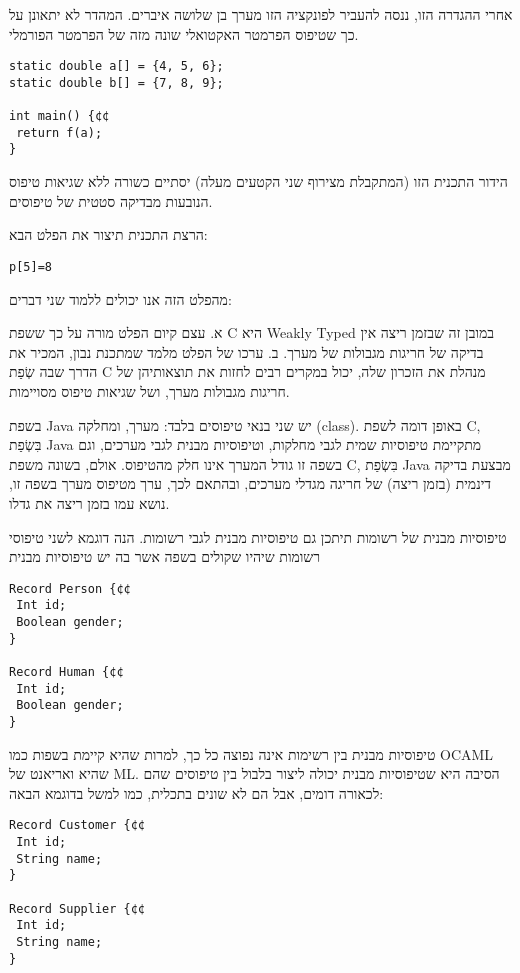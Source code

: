       אחרי ההגדרה הזו, ננסה להעביר לפונקציה הזו מערך בן שלושה איברים. המהדר לא יתאונן על כך שטיפוס הפרמטר האקטואלי שונה מזה של הפרמטר הפורמלי.

\begin{verbatim}
static double a[] = {4, 5, 6};
static double b[] = {7, 8, 9};

int main() {¢¢
 return f(a);
}
\end{verbatim}

      הידור התכנית הזו (המתקבלת מצירוף שני הקטעים מעלה) יסתיים כשורה ללא שגיאות טיפוס הנובעות מבדיקה סטטית של טיפוסים.

      הרצת התכנית תיצור את הפלט הבא:

\begin{verbatim}
p[5]=8
\end{verbatim}

      מהפלט הזה אנו יכולים ללמוד שני דברים:

      א. עצם קיום הפלט מורה על כך ששפת C היא Weakly Typed במובן זה שבזמן ריצה אין בדיקה של חריגות מגבולות של מערך.
      ב. ערכו של הפלט מלמד שמתכנת נבון, המכיר את הדרך שבה שְׂפַת C מנהלת את הזכרון שלה, יכול במקרים רבים לחזות את תוצאותיהן של חריגות מגבולות מערך, ושל שגיאות טיפוס מסויימות.

      בשפת Java יש שני בנאי טיפוסים בלבד: מערך, ומחלקה (class). באופן דומה לשפת C, בִּשְׂפַת Java מתקיימת טיפוסיות שמית לגבי מחלקות, וטיפוסיות מבנית לגבי מערכים, וגם בשפה זו גודל המערך אינו חלק מהטיפוס. אולם, בשונה משפת C, בִּשְׂפַת Java מבצעת בדיקה דינמית (בזמן ריצה) של חריגה מגדלי מערכים, ובהתאם לכך, ערך מטיפוס מערך בשפה זו, נושא עמו בזמן ריצה את גדלו.

      טיפוסיות מבנית של רשומות
      תיתכן גם טיפוסיות מבנית לגבי רשומות. הנה דוגמא לשני טיפוסי רשומות שיהיו שקולים בשפה אשר בה יש טיפוסיות מבנית

\begin{verbatim}
Record Person {¢¢
 Int id;
 Boolean gender;
}

Record Human {¢¢
 Int id;
 Boolean gender;
}
\end{verbatim}

      טיפוסיות מבנית בין רשימות אינה נפוצה כל כך, למרות שהיא קיימת בשפות כמו OCAML שהיא ואריאנט של ML. הסיבה היא שטיפוסיות מבנית יכולה ליצור בלבול בין טיפוסים שהם לכאורה דומים, אבל הם לא שונים בתכלית, כמו למשל בדוגמא הבאה:

\begin{verbatim}
Record Customer {¢¢
 Int id;
 String name;
}

Record Supplier {¢¢
 Int id;
 String name;
}
\end{verbatim}

